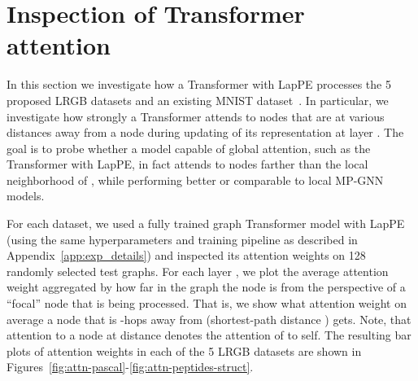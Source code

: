 \documentclass{article}
\begin{document}
\begin{table}[!ht]
    \caption{Baseline performance on \pcqmcontact (link prediction) for MP-GNNs with 2 layers and 500k parameters. Each experiment was repeated with 4 different random seeds. 
}
    \label{tab:experiments_pcqmcontact_additional}
    \begin{adjustwidth}{-2.5 cm}{-2.5 cm}\centering
\end{adjustwidth}
\end{table}


\newpage
\section{Inspection of Transformer attention} \label{app:attn-analysis}
\setcounter{figure}{0}
\setcounter{table}{0}


In this section we investigate how a Transformer with LapPE \cite{dwivedi2020generalization} processes the 5 proposed LRGB datasets and an existing MNIST dataset~\cite{dwivedi2020benchmarking}. In particular, we investigate how strongly a Transformer attends to nodes that are at various  distances away from a node  during updating of its representation  at layer . The goal is to probe whether a model capable of global attention, such as the Transformer with LapPE, in fact attends to nodes farther than the local neighborhood of , while performing better or comparable to local MP-GNN models.

For each dataset, we used a fully trained graph Transformer model with LapPE (using the same hyperparameters and training pipeline as described in Appendix~\ref{app:exp_details}) and inspected its attention weights on 128 randomly selected test graphs. For each layer , we plot the average attention weight aggregated by how far in the graph the node is from the perspective of a ``focal'' node  that is being processed. That is,  we show what attention weight on average a node  that is -hops away from  (shortest-path distance ) gets. Note, that attention to a node at distance  denotes the attention of  to self. The resulting bar plots of attention weights in each of the 5 LRGB datasets are shown in Figures~\ref{fig:attn-pascal}-\ref{fig:attn-peptides-struct}.
\end{document}
